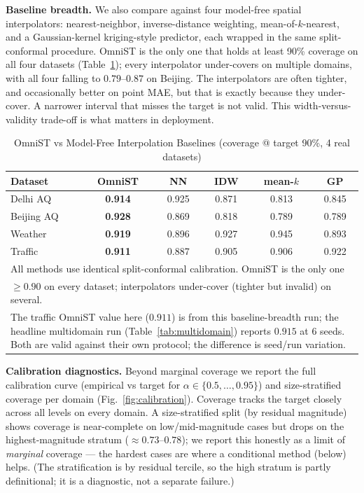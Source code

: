 \documentclass[journal]{IEEEtran}
\begin{document}
\textbf{Baseline breadth.} We also compare against four model-free spatial interpolators:
nearest-neighbor, inverse-distance weighting, mean-of-$k$-nearest, and a Gaussian-kernel kriging-style
predictor, each wrapped in the same split-conformal procedure. OmniST is the only one that holds at
least 90\% coverage on all four datasets (Table~\ref{tab:baselines}); every interpolator under-covers
on multiple domains, with all four falling to $0.79$--$0.87$ on Beijing. The interpolators are often
tighter, and occasionally better on point MAE, but that is exactly because they under-cover. A
narrower interval that misses the target is not valid. This width-versus-validity trade-off is what
matters in deployment.

\begin{table}[htbp]
\caption{OmniST vs Model-Free Interpolation Baselines (coverage @ target 90\%, 4 real datasets)}
\centering
\begin{tabular}{lccccc}
\toprule
\textbf{Dataset} & \textbf{OmniST} & \textbf{NN} & \textbf{IDW} & \textbf{mean-$k$} & \textbf{GP} \\
\midrule
Delhi AQ   & \textbf{0.914} & 0.925 & 0.871 & 0.813 & 0.845 \\
Beijing AQ & \textbf{0.928} & 0.869 & 0.818 & 0.789 & 0.789 \\
Weather    & \textbf{0.919} & 0.896 & 0.927 & 0.945 & 0.893 \\
Traffic    & \textbf{0.911} & 0.887 & 0.905 & 0.906 & 0.922 \\
\bottomrule
\multicolumn{6}{l}{\footnotesize All methods use identical split-conformal calibration. OmniST is the only one} \\
\multicolumn{6}{l}{\footnotesize $\ge 0.90$ on every dataset; interpolators under-cover (tighter but invalid) on several.} \\
\multicolumn{6}{p{0.95\columnwidth}}{\footnotesize The traffic OmniST value here ($0.911$) is from this baseline-breadth run; the headline multidomain run (Table~\ref{tab:multidomain}) reports $0.915$ at 6 seeds. Both are valid against their own protocol; the difference is seed/run variation.} \\
\end{tabular}
\label{tab:baselines}
\end{table}

\textbf{Calibration diagnostics.} Beyond marginal coverage we report the full calibration curve
(empirical vs target for $\alpha\in\{0.5,\dots,0.95\}$) and size-stratified coverage per domain
(Fig.~\ref{fig:calibration}). Coverage tracks the target closely across all levels on every domain.
A size-stratified split (by residual magnitude) shows coverage is near-complete on low/mid-magnitude
cases but drops on the highest-magnitude stratum ($\approx0.73$--$0.78$); we report this honestly as a
limit of \emph{marginal} coverage --- the hardest cases are where a conditional method (below) helps.
(The stratification is by residual tercile, so the high stratum is partly definitional; it is a
diagnostic, not a separate failure.)
\end{document}
